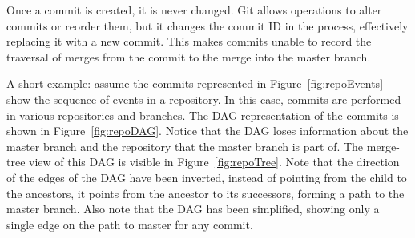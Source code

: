 \documentclass[conference, draftclsnofoot, draft]{IEEEtran}
\begin{document}
Once a commit is created, it is never changed. Git allows operations to alter
commits or reorder them, but it changes the commit ID in the process, effectively
replacing it with a new commit. This makes commits unable to record the traversal of merges
from the commit to the merge into the master branch.

A short example: assume the commits represented in Figure~\ref{fig:repoEvents} show
the sequence of events in a repository. In this case, commits are performed in
various repositories and branches. The DAG representation of the commits is shown in
Figure~\ref{fig:repoDAG}. Notice that the DAG loses information about the master
branch and the repository that the master branch is part of. The merge-tree view of
this DAG is visible in Figure~\ref{fig:repoTree}. Note that the direction of the
edges of the DAG have been inverted, instead of pointing from the child to the
ancestors, it points from the ancestor to its successors, forming a path to the
master branch. Also note that the DAG has been simplified, showing only a single
edge on the path to master for any commit.
\end{document}
